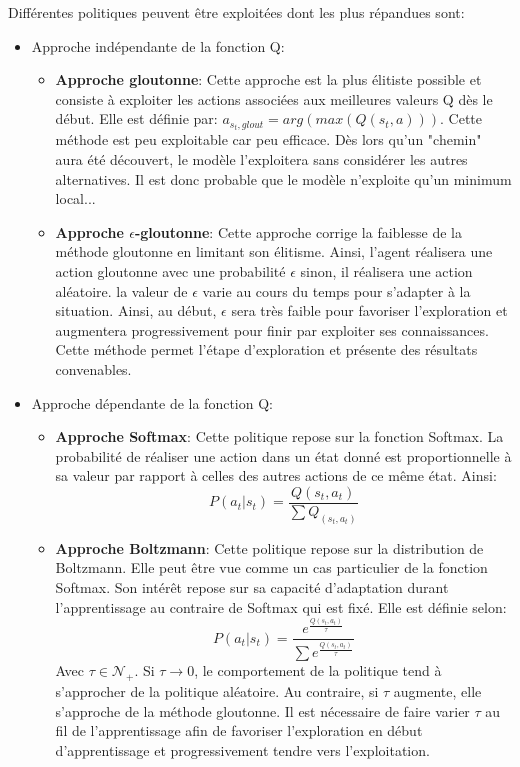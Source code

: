 \noindent Différentes politiques peuvent être exploitées dont les plus répandues sont:
\begin{itemize}

    \item Approche indépendante de la fonction Q:
    \begin{itemize}
        \item \textbf{Approche gloutonne}: Cette approche est la plus élitiste possible et consiste à exploiter les actions associées aux meilleures valeurs Q dès le début. Elle est définie par: $a_{s_t,glout}=arg(max(Q(s_t,a)))$. Cette méthode est peu exploitable car peu efficace. Dès lors qu'un "chemin" aura été découvert, le modèle l'exploitera sans considérer les autres alternatives. Il est donc probable que le modèle n'exploite qu'un minimum local...

        \item \textbf{Approche $\epsilon$-gloutonne}: Cette approche corrige la faiblesse de la méthode gloutonne en limitant son élitisme. Ainsi, l'agent réalisera une action gloutonne avec une probabilité $\epsilon$ sinon, il réalisera une action aléatoire. la valeur de $\epsilon$ varie au cours du temps pour s'adapter à la situation. Ainsi, au début, $\epsilon$ sera très faible pour favoriser l'exploration et augmentera progressivement pour finir par exploiter ses connaissances. Cette méthode permet l'étape d'exploration et présente des résultats convenables.
    \end{itemize}
    \item Approche dépendante de la fonction Q:
    \begin{itemize}
        \item \textbf{Approche Softmax}: Cette politique repose sur la fonction Softmax. La probabilité de réaliser une action dans un état donné est proportionnelle à sa valeur par rapport à celles des autres actions de ce même état. Ainsi:
        $$P(a_t|s_t)=\frac{Q(s_t,a_t)}{\sum Q_(s_t,a_t)}$$

        \item \textbf{Approche Boltzmann}: Cette politique repose sur la distribution de Boltzmann. Elle peut être vue comme un cas particulier de la fonction Softmax. Son intérêt repose sur sa capacité d'adaptation durant l'apprentissage au contraire de Softmax qui est fixé. Elle est définie selon:
        $$P(a_t|s_t)=\frac{e^{\frac{Q(s_t,a_t)}{\tau}}}{\sum e^{\frac{Q(s_t,a_t)}{\tau}}}$$
        Avec $\tau \in \mathcal{N_+}$. Si $\tau \rightarrow 0$, le comportement de la politique tend à s'approcher de la politique aléatoire. Au contraire, si $\tau$ augmente, elle s'approche de la méthode gloutonne. Il est nécessaire de faire varier $\tau$ au fil de l'apprentissage afin de favoriser l'exploration en début d'apprentissage et progressivement tendre vers l'exploitation.
    \end{itemize}
\end{itemize}

